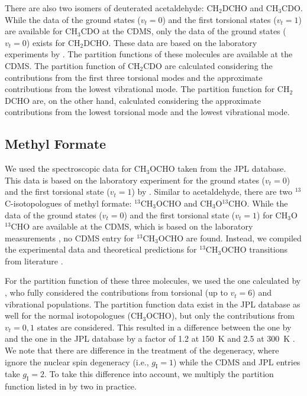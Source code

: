 \documentclass[linenumbers, twocolumn, twocolappendix, astrosymb, times]{aastex631}
\newcommand{\methylformate}{CH$_3$OCHO\xspace}
\begin{document}
There are also two isomers of deuterated acetaldehyde: CH$_2$DCHO and CH$_3$CDO. While the data of the ground states ($v_t = 0$) and the first torsional states ($v_t = 1$) are available for CH$_3$CDO at the CDMS, only the data of the ground states ($v_t = 0$) exists for CH$_2$DCHO. These data are based on the laboratory experiments by \citet{Coudert2019}. The partition functions of these molecules are available at the CDMS. The partition function of CH$_2$CDO are calculated considering the contributions from the first three torsional modes and the approximate contributions from the lowest vibrational mode. The partition function for CH$_2$DCHO are, on the other hand, calculated considering the approximate contributions from the lowest torsional mode and the lowest vibrational mode.


\subsection{Methyl Formate}
We used the spectroscopic data for \methylformate taken from the JPL database. This data is based on the laboratory experiment for the ground states ($v_t = 0$) and the first torsional state ($v_t = 1$) by \citet{Ilyushin2009}. Similar to acetaldehyde, there are two $^{13}$C-isotopologues of methyl formate: $^{13}$CH$_3$OCHO and CH$_3$O$^{13}$CHO. While the data of the ground states ($v_t = 0$) and the first torsional state ($v_t = 1$) for CH$_3$O$^{13}$CHO are available at the CDMS, which is based on the laboratory measurements \citep[][and references therein]{Carvajal2010}, no CDMS entry for $^{13}$CH$_3$OCHO are found. Instead, we compiled the experimental data and theoretical predictions for $^{13}$CH$_3$OCHO transitions from literature \citep{Carvajal2009, Haykal2014, Favre2014}. 

For the partition function of these three molecules, we used the one calculated by \citet{Favre2014}, who fully considered the contributions from torsional (up to $v_t=6$) and vibrational populations. The partition function data exist in the JPL database as well for the normal isotopologues (\methylformate), but only the contributions from $v_t = 0, 1$ states are considered. This resulted in a difference between the one by \citet{Favre2014} and the one in the JPL database by a factor of 1.2 at 150~K and 2.5 at 300~K \citep{Favre2014}. We note that there are difference in the treatment of the degeneracy, where \citet{Favre2014} ignore the nuclear spin degeneracy (i.e., $g_\mathrm{I} = 1$) while the CDMS and JPL entries take $g_\mathrm{I} = 2$. To take this difference into account, we multiply the partition function listed in \citet{Favre2014} by two in practice.
\end{document}
